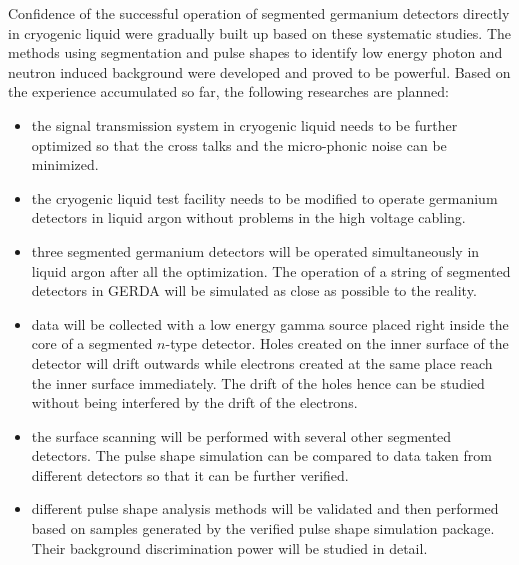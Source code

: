 Confidence of the successful operation of segmented germanium detectors directly in cryogenic liquid were gradually built up based on these systematic studies. The methods using segmentation and pulse shapes to identify low energy photon and neutron induced background were developed and proved to be powerful. Based on the experience accumulated so far, the following researches are planned:
\begin{itemize}
\item the signal transmission system in cryogenic liquid needs to be further optimized so that the cross talks and the micro-phonic noise can be minimized.
\item the cryogenic liquid test facility needs to be modified to operate germanium detectors in liquid argon without problems in the high voltage cabling.
\item three segmented germanium detectors will be operated simultaneously in liquid argon after all the optimization. The operation of a string of segmented detectors in GERDA will be simulated as close as possible to the reality.
\item data will be collected with a low energy gamma source placed right inside the core of a segmented $n$-type detector. Holes created on the inner surface of the detector will drift outwards while electrons created at the same place reach the inner surface immediately. The drift of the holes hence can be studied without being interfered by the drift of the electrons.
\item the surface scanning will be performed with several other segmented detectors. The pulse shape simulation can be compared to data taken from different detectors so that it can be further verified.
\item different pulse shape analysis methods will be validated and then performed based on samples generated by the verified pulse shape simulation package. Their background discrimination power will be studied in detail.
\end{itemize}


